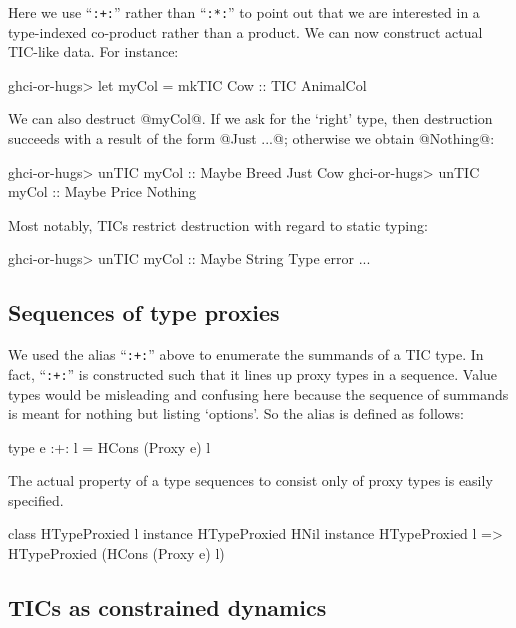 \documentclass[nocopyrightspace,preprint]{sigplan-proc}
\begin{document}
Here we use ``\verb!:+:!'' rather than ``\verb!:*:!'' to point out
that we are interested in a type-indexed co-product rather than a
product. We can now construct actual TIC-like data. For instance:

\begin{code}
 ghci-or-hugs> let myCol = mkTIC Cow :: TIC AnimalCol
\end{code}

We can also destruct @myCol@. If we ask for the `right' type, then
destruction succeeds with a result of the form @Just ...@; otherwise
we obtain @Nothing@:

\begin{code}
 ghci-or-hugs> unTIC myCol :: Maybe Breed
 Just Cow
 ghci-or-hugs> unTIC myCol :: Maybe Price
 Nothing
\end{code}

Most notably, TICs restrict destruction with regard to static typing:

\begin{code}
 ghci-or-hugs> unTIC myCol :: Maybe String
 Type error ...
\end{code}

\medskip

\subsection*{Sequences of type proxies}

We used the alias ``\verb!:+:!'' above to enumerate the summands of a
TIC type. In fact, ``\verb!:+:!'' is constructed such that it lines up
proxy types in a sequence. Value types would be misleading and
confusing here because the sequence of summands is meant for nothing
but listing `options'. So the alias is defined as follows:

\begin{code}
 type e :+: l = HCons (Proxy e) l
\end{code}

The actual property of a type sequences to consist only of proxy types
is easily specified.

\begin{code}
class HTypeProxied l
instance HTypeProxied HNil
instance HTypeProxied l
      => HTypeProxied (HCons (Proxy e) l)
\end{code}

\medskip

\subsection*{TICs as constrained dynamics}
\end{document}
